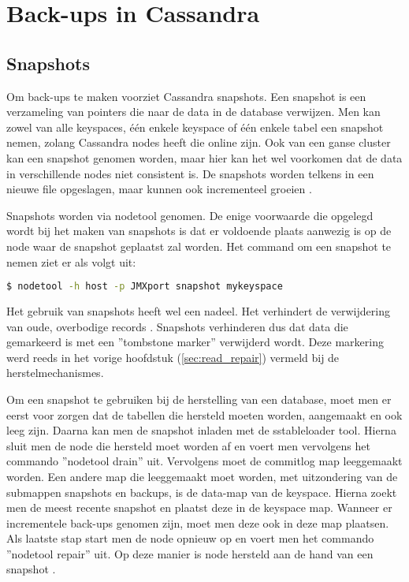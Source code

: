 \chapter{Back-ups in Cassandra}
\label{ch:cassandra_backups}

\section{Snapshots}
Om back-ups te maken voorziet Cassandra snapshots.
Een snapshot is een verzameling van pointers die naar de data in de database verwijzen.
Men kan zowel van alle keyspaces, één enkele keyspace of één enkele tabel een snapshot nemen, zolang Cassandra nodes heeft die online zijn.
Ook van een ganse cluster kan een snapshot genomen worden, maar hier kan het wel voorkomen dat de data in verschillende nodes niet consistent is.
De snapshots worden telkens in een nieuwe file opgeslagen, maar kunnen ook incrementeel groeien \citep{DataStax2016Snapshot}.

Snapshots worden via nodetool genomen.
De enige voorwaarde die opgelegd wordt bij het maken van snapshots is dat er voldoende plaats aanwezig is op de node waar de snapshot geplaatst zal worden.
Het command om een snapshot te nemen ziet er als volgt uit:

\begin{lstlisting}[language=Bash, breaklines=true]
$ nodetool -h host -p JMXport snapshot mykeyspace
\end{lstlisting}

Het gebruik van snapshots heeft wel een nadeel.
Het verhindert de verwijdering van oude, overbodige records \citep{DataStax2016Snapshot}.
Snapshots verhinderen dus dat data die gemarkeerd is met een ''tombstone marker'' verwijderd wordt.
Deze markering werd reeds in het vorige hoofdstuk (\ref{sec:read_repair}) vermeld bij de herstelmechanismes.

Om een snapshot te gebruiken bij de herstelling van een database, moet men er eerst voor zorgen dat de tabellen die hersteld moeten worden, aangemaakt en ook leeg zijn.
Daarna kan men de snapshot inladen met de sstableloader tool.
Hierna sluit men de node die hersteld moet worden af en voert men vervolgens het commando ''nodetool drain'' uit.
Vervolgens moet de commitlog map leeggemaakt worden.
Een andere map die leeggemaakt moet worden, met uitzondering van de submappen snapshots en backups, is de data-map van de keyspace.
Hierna zoekt men de meest recente snapshot en plaatst deze in de keyspace map.
Wanneer er incrementele back-ups genomen zijn, moet men deze ook in deze map plaatsen.
Als laatste stap start men de node opnieuw op en voert men het commando ''nodetool repair'' uit.
Op deze manier is node hersteld aan de hand van een snapshot \citep{DataStax2016Snapshot}.

